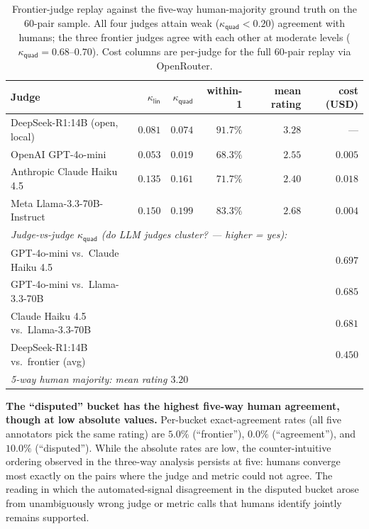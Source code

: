 \begin{table}[!htbp]
  \centering
  \caption{Frontier-judge replay against the five-way human-majority
    ground truth on the 60-pair sample. All four judges attain weak
    ($\kappa_{\textsf{quad}} < 0.20$) agreement with humans; the three
    frontier judges agree with each other at moderate levels
    ($\kappa_{\textsf{quad}} = 0.68$--$0.70$). Cost columns are
    per-judge for the full 60-pair replay via OpenRouter.}
  \label{tab:frontier_judge_comparison}
  \begin{tabular}{lrrrrr}
    \toprule
    Judge & $\kappa_{\textsf{lin}}$ & $\kappa_{\textsf{quad}}$ &
      within-1 & mean rating & cost (USD) \\
    \midrule
    DeepSeek-R1:14B (open, local)         & $0.081$ & $0.074$ & $91.7\%$ & $3.28$ & --- \\
    OpenAI GPT-4o-mini                    & $0.053$ & $0.019$ & $68.3\%$ & $2.55$ & $0.005$ \\
    Anthropic Claude Haiku 4.5            & $0.135$ & $0.161$ & $71.7\%$ & $2.40$ & $0.018$ \\
    Meta Llama-3.3-70B-Instruct           & $0.150$ & $0.199$ & $83.3\%$ & $2.68$ & $0.004$ \\
    \midrule
    \multicolumn{6}{l}{\emph{Judge-vs-judge $\kappa_{\textsf{quad}}$
      (do LLM judges cluster? --- higher = yes):}} \\
    GPT-4o-mini vs.\ Claude Haiku 4.5     & \multicolumn{5}{r}{$0.697$} \\
    GPT-4o-mini vs.\ Llama-3.3-70B        & \multicolumn{5}{r}{$0.685$} \\
    Claude Haiku 4.5 vs.\ Llama-3.3-70B   & \multicolumn{5}{r}{$0.681$} \\
    DeepSeek-R1:14B vs.\ frontier (avg)   & \multicolumn{5}{r}{$0.450$} \\
    \multicolumn{6}{l}{\emph{5-way human majority: mean rating $3.20$}} \\
    \bottomrule
  \end{tabular}
\end{table}

\textbf{The ``disputed'' bucket has the highest five-way human
agreement, though at low absolute values.} Per-bucket exact-agreement
rates (all five annotators pick the same rating) are $5.0\%$
(``frontier''), $0.0\%$ (``agreement''), and $10.0\%$ (``disputed'').
While the absolute rates are low, the counter-intuitive ordering
observed in the three-way analysis persists at five: humans converge
most exactly on the pairs where the judge and metric could not agree.
The reading in which the automated-signal disagreement in the disputed
bucket arose from unambiguously wrong judge or metric calls that humans
identify jointly remains supported.

